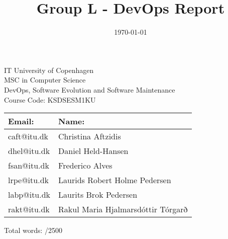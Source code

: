 \documentclass{article}
\title{Group L - DevOps Report}
\author{ }
\date{\today}
\def\totalwords{\the\numexpr\theword\relax}
\begin{document}
\maketitle
\begin{center}
    IT University of Copenhagen \\
    MSC in Computer Science \\
    DevOps, Software Evolution and Software Maintenance \\ 
    Course Code: KSDSESM1KU \\
\end{center}

\begin{table}[h]
    \begin{center}
        \begin{tabular*}{1\textwidth}{l l}
        \toprule
        Email: & Name: \\
        \midrule
        {caft@itu.dk} & {Christina Aftzidis} \\
        {dhel@itu.dk} & {Daniel Held-Hansen} \\
        {fsan@itu.dk} & {Frederico Alves} \\
        {lrpe@itu.dk} & {Laurids Robert Holme Pedersen} \\
        {labp@itu.dk} & {Laurits Brok Pedersen} \\
        {rakt@itu.dk} & {Rakul Maria Hjalmarsdóttir Tórgarð} \\
        \bottomrule
        \end{tabular*}
    \end{center}
\end{table}
\newpage
\tableofcontents
\newpage

Total words: \totalwords/2500




\newpage
 
\newpage

\end{document}
